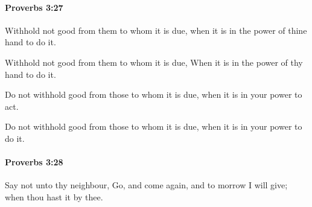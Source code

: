 		\paragraph{Proverbs 3:27} %
			\label{PROVERBS-3-27}

			Withhold not good from them to whom it is due, when it is in the power of thine hand to do it.

			\begin{versebox}
					\item[BHS] 
					\item[ASV] Withhold not good from them to whom it is due, When it is in the power of thy hand to do it.
					\item[NIV] Do not withhold good from those to whom it is due, when it is in your power to act.
					\item[NRSV] Do not withhold good from those to whom it is due, when it is in your power to do it.
			\end{versebox}

		\paragraph{Proverbs 3:28} %
			\label{PROVERBS-3-28}

			Say not unto thy neighbour, Go, and come again, and to morrow I will give; when thou hast it by thee.

